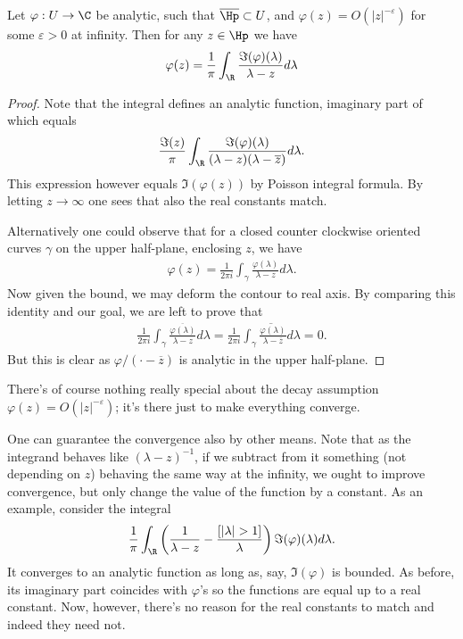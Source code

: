 \begin{lause}
	Let $\varphi : U \to \C$ be analytic, such that $\overline{\Hp} \subset U$, and $\varphi(z) = O(|z|^{-\varepsilon})$ for some $\varepsilon > 0$ at infinity. Then for any $z \in \Hp$ we have
	\begin{align*}
		\varphi(z) = \frac{1}{\pi}\int_{\R} \frac{\Im(\varphi)(\lambda)}{\lambda - z} d \lambda
	\end{align*}
\end{lause}
\begin{proof}
	Note that the integral defines an analytic function, imaginary part of which equals
	\begin{align*}
		\frac{\Im(z)}{\pi}\int_{\R} \frac{\Im(\varphi)(\lambda)}{(\lambda - z)(\lambda - \overline{z})} d \lambda.
	\end{align*}
	This expression however equals $\Im(\varphi(z))$ by Poisson integral formula. By letting $z \to \infty$ one sees that also the real constants match.

	Alternatively one could observe that for a closed counter clockwise oriented curves $\gamma$ on the upper half-plane, enclosing $z$, we have
	\begin{align*}
		\varphi(z) = \frac{1}{2\pi i}\int_{\gamma} \frac{\varphi(\lambda)}{\lambda - z} d \lambda.
	\end{align*}
	Now given the bound, we may deform the contour to real axis. By comparing this identity and our goal, we are left to prove that
	\begin{align*}
		\frac{1}{2\pi i}\int_{\gamma} \frac{\overline{\varphi(\lambda)}}{\lambda - z} d \lambda = \frac{1}{2\pi i} \overline{\int_{\gamma} \frac{\varphi(\lambda)}{\lambda - \overline{z}} d \lambda} = 0.
	\end{align*}
	But this is clear as $\varphi/(\cdot - \overline{z})$ is analytic in the upper half-plane.
\end{proof}

There's of course nothing really special about the decay assumption $\varphi(z) = O(|z|^{-\varepsilon})$; it's there just to make everything converge.

One can guarantee the convergence also by other means. Note that as the integrand behaves like $(\lambda - z)^{-1}$, if we subtract from it something (not depending on $z$) behaving the same way at the infinity, we ought to improve convergence, but only change the value of the function by a constant. As an example, consider the integral
\begin{align}\label{easy_pick_repr}
	\frac{1}{\pi}\int_{\R} \left(\frac{1}{\lambda - z} - \frac{[|\lambda| > 1]}{\lambda} \right) \Im(\varphi)(\lambda)d \lambda.
\end{align}
It converges to an analytic function as long as, say, $\Im(\varphi)$ is bounded. As before, its imaginary part coincides with $\varphi$'s so the functions are equal up to a real constant. Now, however, there's no reason for the real constants to match and indeed they need not.

